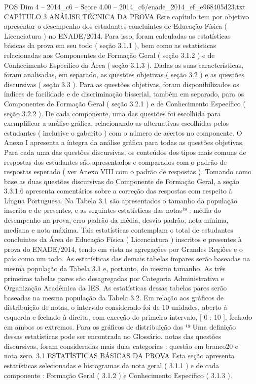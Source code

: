 \begin{textsample}{POS Dim 4 – 2014\_c6 – Score 4.00 – 2014\_c6/enade\_2014\_ef\_e968405d23.txt}  \label{ex:f4_pos_075}
CAPÍTULO 3 ANÁLISE TÉCNICA DA PROVA Este capítulo tem por objetivo apresentar o desempenho dos estudantes concluintes de Educação Física ( Licenciatura ) no ENADE/2014.
Para isso, foram calculadas as estatísticas básicas da prova em seu todo ( seção 3.1.1 ), bem como as estatísticas relacionadas aos Componentes de Formação Geral ( seção 3.1.2 ) e de Conhecimento Específico da Área ( seção 3.1.3 ).
Dadas as suas características, foram analisadas, em separado, as questões objetivas ( seção 3.2 ) e as questões discursivas ( seção 3.3 ).
Para as questões objetivas, foram disponibilizados os índices de facilidade e de discriminação bisserial, também em separado, para os Componentes de Formação Geral ( seção 3.2.1 ) e de Conhecimento Específico ( seção 3.2.2 ).
De cada componente, uma das questões foi escolhida para exemplificar a análise gráfica, relacionando as alternativas escolhidas pelos estudantes ( inclusive o gabarito ) com o número de acertos no componente.
O Anexo I apresenta a íntegra da análise gráfica para todas as questões objetivas.
Para cada uma das questões discursivas, os conteúdos dos tipos mais comuns de respostas dos estudantes são apresentados e comparados com o padrão de respostas esperado ( ver Anexo VIII com o padrão de respostas ).
Tomando como base as duas questões discursivas do Componente de Formação Geral, a seção 3.3.1.6 apresenta comentários sobre a correção das respostas com respeito à Língua Portuguesa.
Na Tabela 3.1 são apresentados o tamanho da população inscrita e de presentes, e as seguintes estatísticas das notas¹⁹ : média do desempenho na prova, erro padrão da média, desvio padrão, nota mínima, mediana e nota máxima.
Tais estatísticas contemplam o total de estudantes concluintes da Área de Educação Física ( Licenciatura ) inscritos e presentes à prova do ENADE/2014, tendo em vista as agregações por Grandes Regiões e o país como um todo.
As estatísticas das demais tabelas ímpares serão baseadas na mesma população da Tabela 3.1 e, portanto, do mesmo tamanho.
As três primeiras tabelas pares são desagregadas por Categoria Administrativa e Organização Acadêmica da IES.
As estatísticas dessas tabelas pares serão baseadas na mesma população da Tabela 3.2.
Em relação aos gráficos de distribuição de notas, o intervalo considerado foi de 10 unidades, aberto à esquerda e fechado à direita, com exceção do primeiro intervalo, [ 0 ; 10 ], fechado em ambos os extremos.
Para os gráficos de distribuição das ¹⁹ Uma definição dessas estatísticas pode ser encontrada no Glossário. notas das questões discursivas, foram consideradas mais duas categorias : questão em branco20 e nota zero. 3.1 ESTATÍSTICAS BÁSICAS DA PROVA Esta seção apresenta estatísticas selecionadas e histogramas da nota geral ( 3.1.1 ) e de cada componente : Formação Geral ( 3.1.2 ) e Conhecimento Específico ( 3.1.3 ).

\end{textsample}
